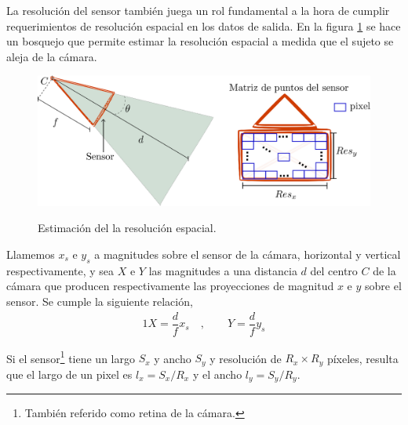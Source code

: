  
 La resolución del sensor también juega un rol fundamental a la hora de cumplir requerimientos de resolución espacial en los datos de salida.
 En la figura \ref{estimacion_resolucion} se hace un bosquejo que permite estimar la resolución espacial a medida que el sujeto se aleja de la cámara.
 
\begin{figure}[H]
  \centering
  {\includegraphics[scale=0.5]{img/Base_Datos/camara_resolucion.eps}}      
  \caption{Estimación del la resolución espacial.}
  \label{estimacion_resolucion}
\end{figure} 

Llamemos $x_s$ e $y_s$ a magnitudes sobre el sensor de la cámara, horizontal y vertical respectivamente, y sea $X$ e $Y$ las magnitudes a una distancia $d$ del centro $C$ de la cámara que producen respectivamente las proyecciones de magnitud $x$ e $y$ sobre el sensor.
Se cumple la siguiente relación,
\begin{alignat*}{1}
X = \dfrac{d}{f}x_s&~, \quad \quad Y = \dfrac{d}{f}y_s
\end{alignat*}

Si el sensor\footnote{También referido como retina de la cámara.} tiene un largo $S_x$ y ancho $S_y$ y resolución de $R_x\times R_y$ píxeles, resulta que el largo de un pixel es $l_x = S_x/R_x $ y el ancho $l_y = S_y/ R_y$. 

